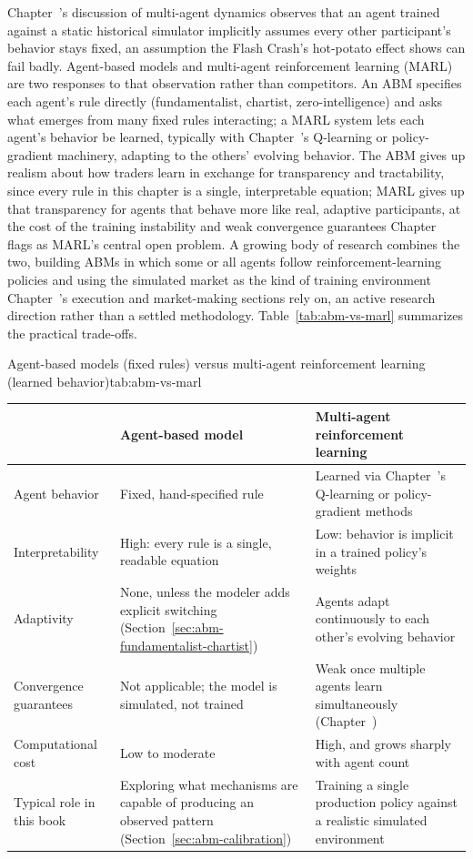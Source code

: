 \documentclass[../ai_in_finance]{subfiles}
\begin{document}
Chapter~'s discussion of multi-agent dynamics observes that an agent trained against a static historical simulator implicitly assumes every other participant's behavior stays fixed, an assumption the Flash Crash's hot-potato effect shows can fail badly. Agent-based models and multi-agent reinforcement learning (MARL) are two responses to that observation rather than competitors. An ABM specifies each agent's rule directly (fundamentalist, chartist, zero-intelligence) and asks what emerges from many fixed rules interacting; a MARL system lets each agent's behavior be learned, typically with Chapter~'s Q-learning or policy-gradient machinery, adapting to the others' evolving behavior. The ABM gives up realism about how traders learn in exchange for transparency and tractability, since every rule in this chapter is a single, interpretable equation; MARL gives up that transparency for agents that behave more like real, adaptive participants, at the cost of the training instability and weak convergence guarantees Chapter~ flags as MARL's central open problem. A growing body of research combines the two, building ABMs in which some or all agents follow reinforcement-learning policies and using the simulated market as the kind of training environment Chapter~'s execution and market-making sections rely on, an active research direction rather than a settled methodology. Table~\ref{tab:abm-vs-marl} summarizes the practical trade-offs.

\begin{booktable}[htbp]{Agent-based models (fixed rules) versus multi-agent reinforcement learning (learned behavior)}{tab:abm-vs-marl}
\begin{tabular}{L{3.0cm}L{5.0cm}L{5.6cm}}
\toprule
 & Agent-based model & Multi-agent reinforcement learning \\
\midrule
Agent behavior     & Fixed, hand-specified rule            & Learned via Chapter~'s Q-learning or policy-gradient methods \\
Interpretability   & High: every rule is a single, readable equation & Low: behavior is implicit in a trained policy's weights \\
Adaptivity         & None, unless the modeler adds explicit switching (Section~\ref{sec:abm-fundamentalist-chartist}) & Agents adapt continuously to each other's evolving behavior \\
Convergence guarantees & Not applicable; the model is simulated, not trained & Weak once multiple agents learn simultaneously (Chapter~) \\
Computational cost & Low to moderate                        & High, and grows sharply with agent count \\
Typical role in this book & Exploring what mechanisms are capable of producing an observed pattern (Section~\ref{sec:abm-calibration}) & Training a single production policy against a realistic simulated environment \\
\bottomrule
\end{tabular}
\end{booktable}
\end{document}
